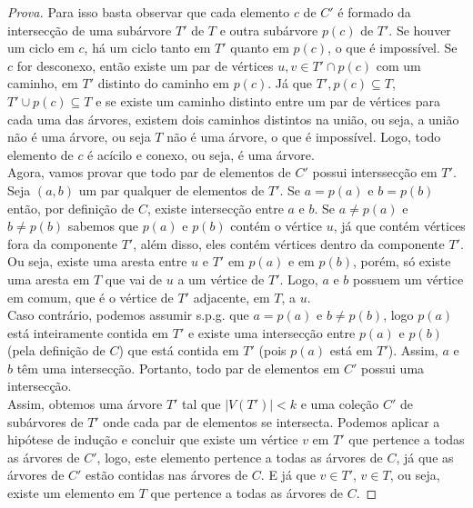 \documentclass[12pt]{article}
\begin{document}
\begin{proof}[Prova]
Para isso basta observar que cada elemento $c$ de $C'$ é formado da intersecção de uma subárvore $T'$ de $T$ e outra subárvore $p(c)$ de $T'$. Se houver um ciclo em $c$, há um ciclo tanto em $T'$ quanto em $p(c)$, o que é impossível. Se $c$ for desconexo, então existe um par de vértices $u, v \in T' \cap p(c)$ com um caminho, em $T'$ distinto do caminho em $p(c)$. Já que $T', p(c) \subseteq T$, $T' \cup p(c) \subseteq T$ e se existe um caminho distinto entre um par de vértices para cada uma das árvores, existem dois caminhos distintos na união, ou seja, a união não é uma árvore, ou seja $T$ não é uma árvore, o que é impossível. Logo, todo elemento de $c$ é acícilo e conexo, ou seja, é uma árvore. \\
Agora, vamos provar que todo par de elementos de $C'$ possui interssecção em $T'$.\\
Seja $(a,b)$ um par qualquer de elementos de $T'$. Se $a = p(a)$ e $b = p(b)$ então, por definição de $C$, existe intersecção entre $a$ e $b$. Se $a \neq p(a)$ e $b \neq p(b)$ sabemos que $p(a)$ e $p(b)$ contém o vértice $u$, já que contém vértices fora da componente $T'$, além disso, eles contém vértices dentro da componente $T'$. Ou seja, existe uma aresta entre $u$ e $T'$ em $p(a)$ e em $p(b)$, porém, só existe uma aresta em $T$ que vai de $u$ a um vértice de $T'$. Logo, $a$ e $b$ possuem um vértice em comum, que é o vértice de $T'$ adjacente, em $T$, a $u$. \\
Caso contrário, podemos assumir s.p.g. que $a = p(a)$ e $b \neq p(b)$, logo $p(a)$ está inteiramente contida em $T'$ e existe uma intersecção entre $p(a)$ e $p(b)$ (pela definição de $C$) que está contida em $T'$ (pois $p(a)$ está em $T'$). Assim, $a$ e $b$ têm uma intersecção. Portanto, todo par de elementos em $C'$ possui uma intersecção. \\
Assim, obtemos uma árvore $T'$ tal que $|V(T')| < k$ e uma coleção $C'$ de subárvores de $T'$ onde cada par de elementos se intersecta. Podemos aplicar a hipótese de indução e concluir que existe um vértice $v$ em $T'$ que pertence a todas as árvores de $C'$, logo, este elemento pertence a todas as árvores de $C$, já que as árvores de $C'$ estão contidas nas árvores de $C$. E já que $v \in T'$, $v \in T$, ou seja, existe um elemento em $T$ que pertence a todas as árvores de $C$.


\end{proof}
\end{document}

